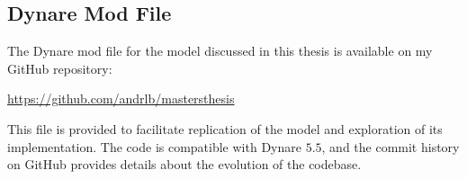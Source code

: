 \documentclass[../thesis.tex]{subfiles}
\begin{document}
\newpage

\subsection{Dynare Mod File}

The Dynare mod file for the model discussed in this thesis is available on my GitHub repository:

\url{https://github.com/andrlb/mastersthesis}

This file is provided to facilitate replication of the model and exploration of its implementation. The code is compatible with Dynare $5.5$, and the commit history on GitHub provides details about the evolution of the codebase.
\end{document}

